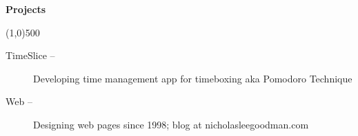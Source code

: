 \documentclass[letterpaper,11pt]{article}
\newcommand{\resheading}[1]{{\large {\begin{minipage}{\textwidth}{\textbf{#1 \vphantom{p\^{E}}}}\end{minipage}}}}
\begin{document}
\resheading{Projects}

\line(1,0){500}

	\begin{description}
		\item[TimeSlice --]{Developing time management app for timeboxing aka Pomodoro Technique}
		
    	\item[Web --]{Designing web pages since 1998; blog at nicholasleegoodman.com}
    		
	\end{description} %
\end{document}

